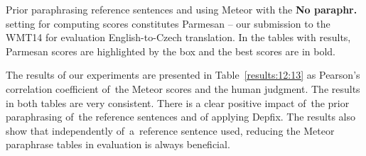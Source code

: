 \documentclass[11pt]{article}
\def \xxx#1{\textbf{\textcolor{red}{xxx: #1}}}
\def\Tref#1{Table~\ref{#1}}
\begin{document}
Prior paraphrasing reference sentences and using Meteor with the \textbf{No paraphr.} setting
for computing scores constitutes Parmesan -- our submission to the WMT14 for evaluation 
English-to-Czech translation. In the tables with results, Parmesan scores are highlighted by 
the box and the best scores are in bold. %

\begin{table}[htb]
\begin{center}

\vspace{10pt}

\caption{Pearson's correlation of Meteor and the silver standard.}
\label{results:12:13}
\end{center}
\end{table}

The results of our experiments are presented in \Tref{results:12:13} as Pearson’s correlation 
coefficient of~the Meteor scores and the human judgment. The results in both tables are very 
consistent. There is a clear positive impact of~the prior paraphrasing of~the reference sentences 
and of applying Depfix. The results also show that independently of~a~reference sentence used, 
reducing the Meteor paraphrase tables in evaluation is always beneficial.
\end{document}
